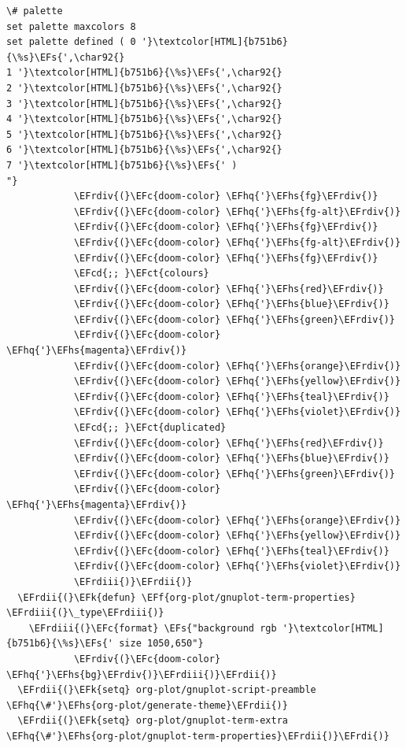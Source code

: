 \documentclass{scrartcl}
\newcommand{\EFk}[1]{\textcolor{EFk}{#1}} %
\newcommand{\EFs}[1]{\textcolor{EFs}{#1}} %
\newcommand{\EFct}[1]{\textcolor{EFct}{#1}} %
\newcommand{\EFc}[1]{\textcolor{EFc}{#1}} %
\newcommand{\EFf}[1]{\textcolor{EFf}{#1}} %
\newcommand{\EFcd}[1]{\textcolor{EFcd}{#1}} %
\newcommand{\EFhq}[1]{\textcolor{EFhq}{#1}} %
\newcommand{\EFhs}[1]{\textcolor{EFhs}{#1}} %
\newcommand{\EFrdi}[1]{\textcolor{EFrdi}{#1}} %
\newcommand{\EFrdii}[1]{\textcolor{EFrdii}{#1}} %
\newcommand{\EFrdiii}[1]{\textcolor{EFrdiii}{#1}} %
\newcommand{\EFrdiv}[1]{\textcolor{EFrdiv}{#1}} %
\begin{document}
\begin{Code}
\begin{Verbatim}[]
\# palette
set palette maxcolors 8
set palette defined ( 0 '}\textcolor[HTML]{b751b6}{\%s}\EFs{',\char92{}
1 '}\textcolor[HTML]{b751b6}{\%s}\EFs{',\char92{}
2 '}\textcolor[HTML]{b751b6}{\%s}\EFs{',\char92{}
3 '}\textcolor[HTML]{b751b6}{\%s}\EFs{',\char92{}
4 '}\textcolor[HTML]{b751b6}{\%s}\EFs{',\char92{}
5 '}\textcolor[HTML]{b751b6}{\%s}\EFs{',\char92{}
6 '}\textcolor[HTML]{b751b6}{\%s}\EFs{',\char92{}
7 '}\textcolor[HTML]{b751b6}{\%s}\EFs{' )
"}
            \EFrdiv{(}\EFc{doom-color} \EFhq{'}\EFhs{fg}\EFrdiv{)}
            \EFrdiv{(}\EFc{doom-color} \EFhq{'}\EFhs{fg-alt}\EFrdiv{)}
            \EFrdiv{(}\EFc{doom-color} \EFhq{'}\EFhs{fg}\EFrdiv{)}
            \EFrdiv{(}\EFc{doom-color} \EFhq{'}\EFhs{fg-alt}\EFrdiv{)}
            \EFrdiv{(}\EFc{doom-color} \EFhq{'}\EFhs{fg}\EFrdiv{)}
            \EFcd{;; }\EFct{colours}
            \EFrdiv{(}\EFc{doom-color} \EFhq{'}\EFhs{red}\EFrdiv{)}
            \EFrdiv{(}\EFc{doom-color} \EFhq{'}\EFhs{blue}\EFrdiv{)}
            \EFrdiv{(}\EFc{doom-color} \EFhq{'}\EFhs{green}\EFrdiv{)}
            \EFrdiv{(}\EFc{doom-color} \EFhq{'}\EFhs{magenta}\EFrdiv{)}
            \EFrdiv{(}\EFc{doom-color} \EFhq{'}\EFhs{orange}\EFrdiv{)}
            \EFrdiv{(}\EFc{doom-color} \EFhq{'}\EFhs{yellow}\EFrdiv{)}
            \EFrdiv{(}\EFc{doom-color} \EFhq{'}\EFhs{teal}\EFrdiv{)}
            \EFrdiv{(}\EFc{doom-color} \EFhq{'}\EFhs{violet}\EFrdiv{)}
            \EFcd{;; }\EFct{duplicated}
            \EFrdiv{(}\EFc{doom-color} \EFhq{'}\EFhs{red}\EFrdiv{)}
            \EFrdiv{(}\EFc{doom-color} \EFhq{'}\EFhs{blue}\EFrdiv{)}
            \EFrdiv{(}\EFc{doom-color} \EFhq{'}\EFhs{green}\EFrdiv{)}
            \EFrdiv{(}\EFc{doom-color} \EFhq{'}\EFhs{magenta}\EFrdiv{)}
            \EFrdiv{(}\EFc{doom-color} \EFhq{'}\EFhs{orange}\EFrdiv{)}
            \EFrdiv{(}\EFc{doom-color} \EFhq{'}\EFhs{yellow}\EFrdiv{)}
            \EFrdiv{(}\EFc{doom-color} \EFhq{'}\EFhs{teal}\EFrdiv{)}
            \EFrdiv{(}\EFc{doom-color} \EFhq{'}\EFhs{violet}\EFrdiv{)}
            \EFrdiii{)}\EFrdii{)}
  \EFrdii{(}\EFk{defun} \EFf{org-plot/gnuplot-term-properties} \EFrdiii{(}\_type\EFrdiii{)}
    \EFrdiii{(}\EFc{format} \EFs{"background rgb '}\textcolor[HTML]{b751b6}{\%s}\EFs{' size 1050,650"}
            \EFrdiv{(}\EFc{doom-color} \EFhq{'}\EFhs{bg}\EFrdiv{)}\EFrdiii{)}\EFrdii{)}
  \EFrdii{(}\EFk{setq} org-plot/gnuplot-script-preamble \EFhq{\#'}\EFhs{org-plot/generate-theme}\EFrdii{)}
  \EFrdii{(}\EFk{setq} org-plot/gnuplot-term-extra \EFhq{\#'}\EFhs{org-plot/gnuplot-term-properties}\EFrdii{)}\EFrdi{)}
\end{Verbatim}
\end{Code}
\end{document}
